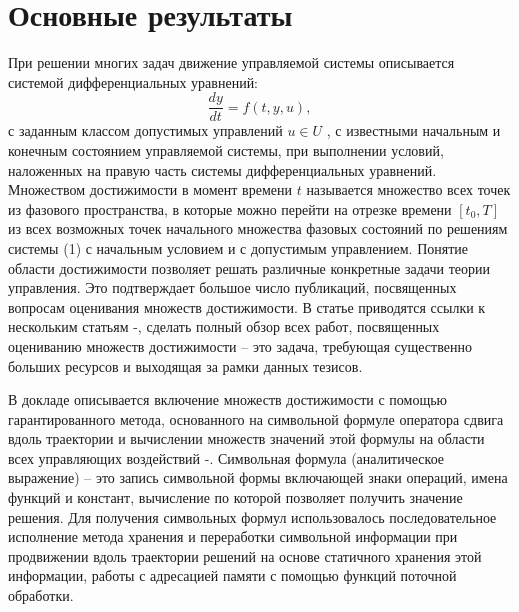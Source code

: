 \section{Основные результаты} %

При решении многих задач движение  управляемой системы описывается  системой дифференциальных уравнений:
\begin{equation}\frac{dy}{dt} = f (t, y, u) ,\end{equation}
с заданным классом допустимых управлений $u \in U$ , с известными начальным и конечным состоянием управляемой системы, при выполнении условий, наложенных на правую часть системы дифференциальных уравнений.
Множеством достижимости   в момент времени  $t$ называется множество всех точек из фазового пространства, в которые можно перейти на отрезке времени $[t_{0},T ]$   из всех возможных точек начального множества фазовых состояний  по решениям системы (1) с начальным условием   и с допустимым управлением.  Понятие области достижимости позволяет решать различные конкретные задачи теории управления. Это подтверждает большое число публикаций, посвященных вопросам  оценивания множеств достижимости. В статье приводятся ссылки к нескольким статьям \cite{Kurzhansky}-\cite{Filippova}, сделать полный обзор всех работ, посвященных оцениванию множеств достижимости -- это задача, требующая существенно больших ресурсов и выходящая за рамки данных тезисов.

 В докладе описывается включение множеств достижимости  с помощью гарантированного метода, основанного на символьной формуле оператора сдвига вдоль  траектории и вычислении множеств значений этой формулы 
 на области всех управляющих воздействий \cite{Rogalev1}-\cite{Rogalev6}.
Символьная формула (аналитическое выражение) – это запись символьной  формы включающей знаки операций, имена функций и констант, вычисление по которой позволяет получить значение решения.
Для получения символьных формул использовалось последовательное исполнение метода хранения и переработки символьной информации при продвижении вдоль траектории решений на основе статичного хранения этой информации, работы с адресацией памяти с помощью функций поточной обработки. %




